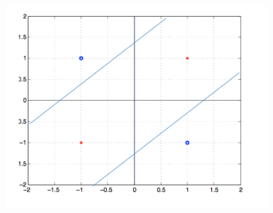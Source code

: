 \documentclass[a4paper,left=2.5cm,right=2.5cm,11pt]{article}
\newcommand{\wuhao}{\fontsize{10.5pt}{\baselineskip}\selectfont}    %
\begin{document}
\begin{figure}[ht]
	\centering
	\includegraphics[width=10cm]{2.png}  
\end{figure}



\end{document}
